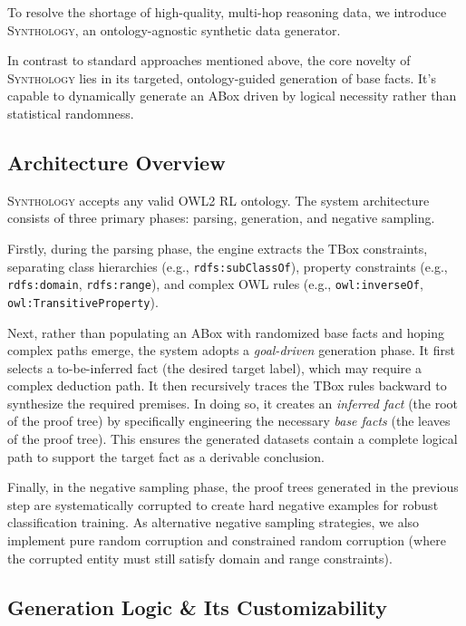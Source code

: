 \documentclass{IOS-Book-Article}     %
\begin{document}
To resolve the shortage of high-quality, multi-hop reasoning data, we introduce \textsc{Synthology}, an ontology-agnostic synthetic data generator.

In contrast to standard approaches mentioned above, the core novelty of \textsc{Synthology} lies in its targeted, ontology-guided generation of base facts. It's capable to dynamically generate an ABox driven by logical necessity rather than statistical randomness.

\subsection{Architecture Overview}
\textsc{Synthology} accepts any valid OWL2 RL ontology. The system architecture consists of three primary phases: parsing, generation, and negative sampling.

Firstly, during the parsing phase, the engine extracts the TBox constraints, separating class hierarchies (e.g., \texttt{rdfs:subClassOf}), property constraints (e.g., \texttt{rdfs:domain}, \texttt{rdfs:range}), and complex OWL rules (e.g., \texttt{owl:inverseOf}, \texttt{owl:TransitiveProperty}).

Next, rather than populating an ABox with randomized base facts and hoping complex paths emerge, the system adopts a \textit{goal-driven} generation phase. It first selects a to-be-inferred fact (the desired target label), which may require a complex deduction path. It then recursively traces the TBox rules backward to synthesize the required premises. In doing so, it creates an \textit{inferred fact} (the root of the proof tree) by specifically engineering the necessary \textit{base facts} (the leaves of the proof tree). This ensures the generated datasets contain a complete logical path to support the target fact as a derivable conclusion.

Finally, in the negative sampling phase, the proof trees generated in the previous step are systematically corrupted to create hard negative examples for robust classification training. As alternative negative sampling strategies, we also implement pure random corruption and constrained random corruption (where the corrupted entity must still satisfy domain and range constraints).

\subsection{Generation Logic \& Its Customizability}
\end{document}
